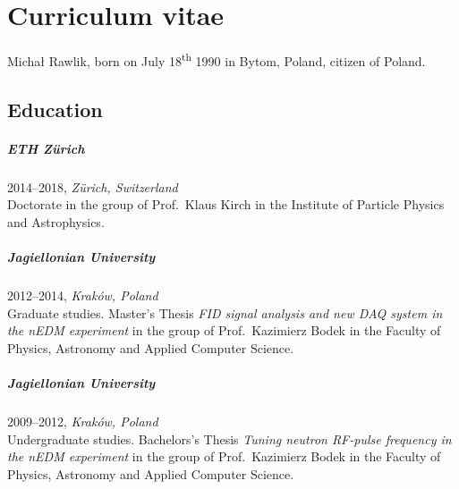 



\manualmark
\markboth{\spacedlowsmallcaps{\bibname}}{\spacedlowsmallcaps{\bibname}} 


\begingroup

\let\clearpage\relax
\let\cleardoublepage\relax
\let\cleardoublepage\relax

\chapter*{Curriculum vitae} %

Michał Rawlik, born on July 18\textsuperscript{th} 1990 in Bytom, Poland, citizen of Poland.

\bigskip

\section*{Education}
\paragraph{ETH Zürich} 2014--2018, \emph{Zürich, Switzerland}\\
Doctorate in the group of Prof.\ Klaus Kirch in the Institute of Particle Physics and Astrophysics.

\paragraph{Jagiellonian University} 2012--2014, \emph{Kraków, Poland}\\
Graduate studies. Master's Thesis \emph{FID signal analysis and new DAQ system in the nEDM experiment} in the group of Prof.\ Kazimierz Bodek in the
Faculty of Physics, Astronomy and Applied Computer Science.

\paragraph{Jagiellonian University} 2009--2012, \emph{Kraków, Poland}\\
Undergraduate studies. Bachelors's Thesis \emph{Tuning neutron RF-pulse frequency in the nEDM experiment} in the group of Prof.\ Kazimierz Bodek in the
Faculty of Physics, Astronomy and Applied Computer Science.

